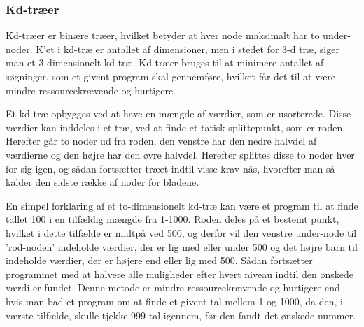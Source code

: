 \subsubsection{Kd-træer}
\label{sec:kdtree}

Kd-træer er binære træer, hvilket betyder at hver node maksimalt har to under-noder. K'et i kd-træ er antallet af dimensioner, men i stedet for 3-d træ, siger man et 3-dimensionelt kd-træ. Kd-træer bruges til at minimere antallet af søgninger, som et givent program skal gennemføre, hvilket får det til at være mindre ressourcekrævende og hurtigere. 

Et kd-træ opbygges ved at have en mængde af værdier, som er usorterede. Disse værdier kan inddeles i et træ, ved at finde et tatisk splittepunkt, som er roden. Herefter går to noder ud fra roden, den venstre har den nedre halvdel af værdierne og den højre har den øvre halvdel. Herefter splittes disse to noder hver for sig igen, og sådan fortsætter træet indtil visse krav nås, hvorefter man så kalder den sidste række af noder for bladene. 

En simpel forklaring af et to-dimensionelt kd-træ kan være et program til at finde tallet 100 i en tilfældig mængde fra 1-1000. Roden deles på et bestemt punkt, hvilket i dette tilfælde er midtpå ved 500, og derfor vil den venstre under-node til 'rod-noden' indeholde værdier, der er lig med eller under 500 og det højre barn til indeholde værdier, der er højere end eller lig med 500. Sådan fortsætter programmet med at halvere alle muligheder efter hvert niveau indtil den ønskede værdi er fundet. Denne metode er mindre ressourcekrævende og hurtigere end hvis man bad et program om at finde et givent tal mellem 1 og 1000, da den, i værste tilfælde, skulle tjekke 999 tal igennem, før den fandt det ønskede nummer.